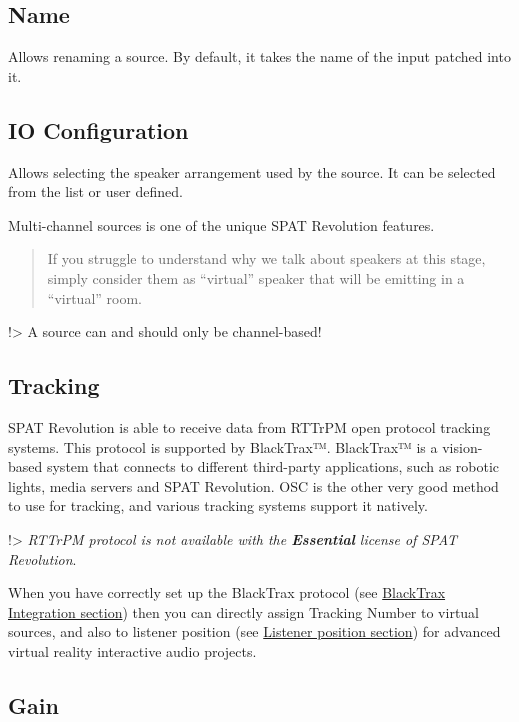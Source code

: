 \documentclass[
  letterpaper,
  DIV=11,
  numbers=noendperiod]{scrreport}
\begin{document}
\hypertarget{name-1}{%
\subsection{Name}\label{name-1}}

Allows renaming a source. By default, it takes the name of the input
patched into it.

\hypertarget{io-configuration}{%
\subsection{IO Configuration}\label{io-configuration}}

Allows selecting the speaker arrangement used by the source. It can be
selected from the list or user defined.

Multi-channel sources is one of the unique SPAT Revolution features.

\begin{quote}
If you struggle to understand why we talk about speakers at this stage,
simply consider them as ``virtual'' speaker that will be emitting in a
``virtual'' room.
\end{quote}

!\textgreater{} A source can and should only be channel-based!

\hypertarget{tracking}{%
\subsection{Tracking}\label{tracking}}

SPAT Revolution is able to receive data from RTTrPM open protocol
tracking systems. This protocol is supported by BlackTrax™. BlackTrax™
is a vision-based system that connects to different third-party
applications, such as robotic lights, media servers and SPAT Revolution.
OSC is the other very good method to use for tracking, and various
tracking systems support it natively.

!\textgreater{} \emph{RTTrPM protocol is not available with the
\textbf{Essential} license of SPAT Revolution}.

When you have correctly set up the BlackTrax protocol (see
\href{ThirdParty_BlackTrax.md}{BlackTrax Integration section}) then you
can directly assign Tracking Number to virtual sources, and also to
listener position (see
\href{Spatialisation_Technology_Listener_Position.md}{Listener position
section}) for advanced virtual reality interactive audio projects.

\hypertarget{gain}{%
\subsection{Gain}\label{gain}}
\end{document}
